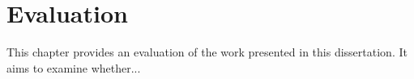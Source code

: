 \chapter{Evaluation}\label{ch:evaluation} %
This chapter provides an evaluation of the work presented in this dissertation. It aims to examine whether...


